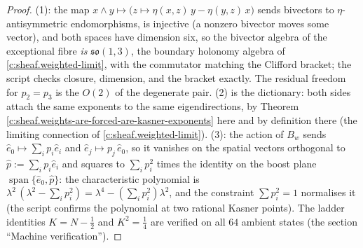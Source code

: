 \documentclass[11pt]{article}
\theoremstyle{definition}
\theoremstyle{plain}
\begin{document}
\begin{proof}
(1): the map $x \wedge y \mapsto \bigl(z \mapsto \eta(x,z)\,y - \eta(y,z)\,x\bigr)$ sends bivectors to $\eta$-antisymmetric endomorphisms, is injective (a nonzero bivector moves some vector), and both spaces have dimension six, so the bivector algebra of the exceptional fibre \emph{is} $\mathfrak{so}(1,3)$, the boundary holonomy algebra of \ref{c:sheaf.weighted-limit}, with the commutator matching the Clifford bracket; the script checks closure, dimension, and the bracket exactly. The residual freedom for $p_2 = p_3$ is the $O(2)$ of the degenerate pair. (2) is the dictionary: both sides attach the same exponents to the same eigendirections, by Theorem \ref{c:sheaf.weights-are-forced-are-kasner-exponents} here and by definition there (the limiting connection of \ref{c:sheaf.weighted-limit}). (3): the action of $B_w$ sends $\hat e_0 \mapsto \sum_i p_i \hat e_i$ and $\hat e_j \mapsto p_j\, \hat e_0$, so it vanishes on the spatial vectors orthogonal to $\hat p := \sum_i p_i \hat e_i$ and squares to $\sum_i p_i^2$ times the identity on the boost plane $\operatorname{span}\{\hat e_0, \hat p\}$: the characteristic polynomial is $\lambda^2\,(\lambda^2 - \sum_i p_i^2) = \lambda^4 - (\sum_i p_i^2)\lambda^2$, and the constraint $\sum p_i^2 = 1$ normalises it (the script confirms the polynomial at two rational Kasner points). The ladder identities $K = N - \tfrac12$ and $K^2 = \tfrac14$ are verified on all $64$ ambient states (the section ``Machine verification'').

\end{proof}
\end{document}
